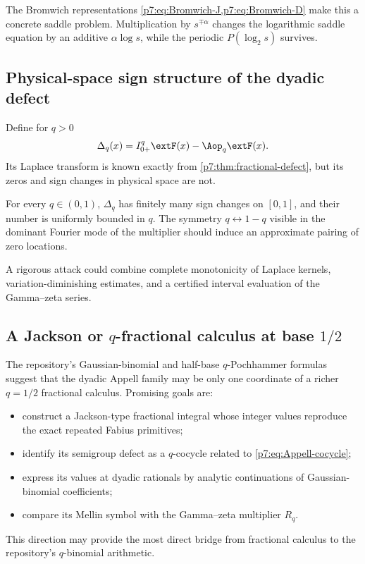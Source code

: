 \documentclass[11pt,oneside]{article}
\theoremstyle{definition}
\theoremstyle{remark}
\newcommand{\1}{\mathbf 1}
\begin{document}
The Bromwich representations \cref{p7:eq:Bromwich-J,p7:eq:Bromwich-D} make this a concrete saddle
problem.  Multiplication by $s^{\mp\alpha}$ changes the logarithmic saddle equation by an
additive $\alpha\log s$, while the periodic $P(\log_2s)$ survives.

\subsection{Physical-space sign structure of the dyadic defect}

Define for $q>0$
\begin{equation}
 \Delta_q(x)=I_{0+}^{q}\extF(x)-\Aop_q\extF(x).
 \label{p7:eq:physical-defect}
\end{equation}
Its Laplace transform is known exactly from \cref{p7:thm:fractional-defect}, but its zeros and
sign changes in physical space are not.

\begin{conjecture}
For every $q\in(0,1)$, $\Delta_q$ has finitely many sign changes on $[0,1]$, and their number
is uniformly bounded in $q$.  The symmetry $q\leftrightarrow1-q$ visible in the dominant
Fourier mode of the multiplier should induce an approximate pairing of zero locations.
\statusopen
\end{conjecture}

A rigorous attack could combine complete monotonicity of Laplace kernels, variation-diminishing
estimates, and a certified interval evaluation of the Gamma--zeta series.

\subsection{A Jackson or $q$-fractional calculus at base $1/2$}

The repository's Gaussian-binomial and half-base $q$-Pochhammer formulas suggest that the
dyadic Appell family may be only one coordinate of a richer $q=1/2$ fractional calculus.
Promising goals are:
\begin{itemize}
\item construct a Jackson-type fractional integral whose integer values reproduce the exact
      repeated Fabius primitives;
\item identify its semigroup defect as a $q$-cocycle related to \cref{p7:eq:Appell-cocycle};
\item express its values at dyadic rationals by analytic continuations of Gaussian-binomial
      coefficients;
\item compare its Mellin symbol with the Gamma--zeta multiplier $R_q$.
\end{itemize}
This direction may provide the most direct bridge from fractional calculus to the repository's
$q$-binomial arithmetic.
\end{document}

